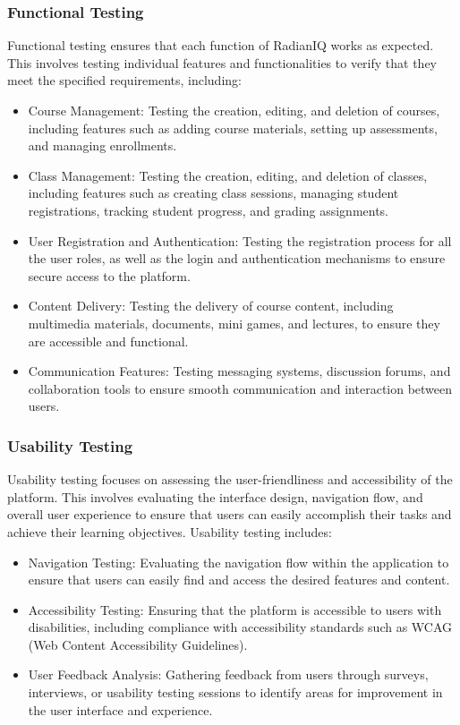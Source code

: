 		\subsubsection{Functional Testing}
		
		Functional testing ensures that each function of RadianIQ works as expected. This involves testing individual features and functionalities to verify that they meet the specified requirements, including:
		
		\begin{itemize}
			\item Course Management: Testing the creation, editing, and deletion of courses, including features such as adding course materials, setting up assessments, and managing enrollments.
			\item Class Management: Testing the creation, editing, and deletion of classes, including features such as creating class sessions, managing student registrations, tracking student progress, and grading assignments.
			\item User Registration and Authentication: Testing the registration process for all the user roles, as well as the login and authentication mechanisms to ensure secure access to the platform.
			\item Content Delivery: Testing the delivery of course content, including multimedia materials, documents, mini games, and lectures, to ensure they are accessible and functional.
			\item Communication Features: Testing messaging systems, discussion forums, and collaboration tools to ensure smooth communication and interaction between users.
		\end{itemize}
		
		\subsubsection{Usability Testing}
		
		Usability testing focuses on assessing the user-friendliness and accessibility of the platform. This involves evaluating the interface design, navigation flow, and overall user experience to ensure that users can easily accomplish their tasks and achieve their learning objectives. Usability testing includes:
		
		\begin{itemize}
			\item Navigation Testing: Evaluating the navigation flow within the application to ensure that users can easily find and access the desired features and content.
			\item Accessibility Testing: Ensuring that the platform is accessible to users with disabilities, including compliance with accessibility standards such as WCAG (Web Content Accessibility Guidelines).
			\item User Feedback Analysis: Gathering feedback from users through surveys, interviews, or usability testing sessions to identify areas for improvement in the user interface and experience.
		\end{itemize}
		
